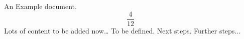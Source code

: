\documentclass{article}
\begin{document}
An Example document.
\[
 \frac{4}{12}
\]
Lots of content to be added now\ldots{} 
To be defined.
Next steps.
Further steps...
\end{document}

